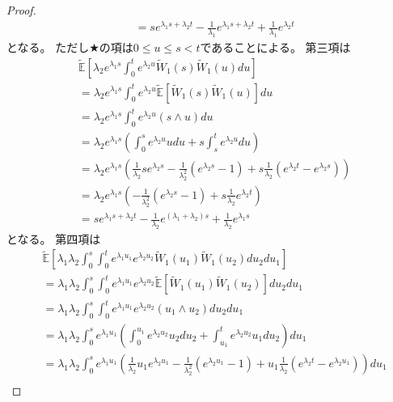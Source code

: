 \documentclass[uplatex]{jsarticle}
\theoremstyle{definition}
\def\E{\mathbb{E}}
\begin{document}
\begin{proof}
\begin{align*}
    &= se^{\lambda_1s+\lambda_2t}
    - \frac{1}{\lambda_1}e^{\lambda_1s+\lambda_2t}
    + \frac{1}{\lambda_1}e^{\lambda_2t}
  \end{align*}
  となる。
  ただし\(\bigstar\)の項は\(0\leq u \leq s < t\)であることによる。
  第三項は
  \begin{align*}
    &\tilde{\E}\left[ \lambda_2e^{\lambda_1s}\int_0^t
    e^{\lambda_2u}\tilde{W}_1(s)\tilde{W}_1(u)du \right] \\
    &= \lambda_2e^{\lambda_1s}\int_0^te^{\lambda_2u}
    \tilde{\E}\left[ \tilde{W}_1(s)\tilde{W}_1(u)\right] du \\
    &= \lambda_2e^{\lambda_1s}\int_0^te^{\lambda_2u} (s\wedge u) du \\
    &= \lambda_2e^{\lambda_1s}\left(
    \int_0^se^{\lambda_2u} u du + s\int_s^te^{\lambda_2u}du \right) \\
    &= \lambda_2e^{\lambda_1s}\left(
    \frac{1}{\lambda_2}se^{\lambda_2s}
    - \frac{1}{\lambda_2^2}\left( e^{\lambda_2s} - 1 \right)
    + s\frac{1}{\lambda_2}\left( e^{\lambda_2t}-e^{\lambda_2s} \right) \right) \\
    &= \lambda_2e^{\lambda_1s}\left(
    - \frac{1}{\lambda_2^2}\left( e^{\lambda_2s} - 1 \right)
    + s\frac{1}{\lambda_2}e^{\lambda_2t} \right) \\
    &= se^{\lambda_1s+\lambda_2t}
    - \frac{1}{\lambda_2}e^{(\lambda_1+\lambda_2)s}
    + \frac{1}{\lambda_2}e^{\lambda_1s}
  \end{align*}
  となる。
  第四項は
  \begin{align*}
    &\tilde{\E}\left[ \lambda_1\lambda_2\int_0^s\int_0^t
    e^{\lambda_1u_1}e^{\lambda_2u_2}\tilde{W}_1(u_1)\tilde{W}_1(u_2)
    du_2du_1 \right] \\
    &= \lambda_1\lambda_2 \int_0^s\int_0^t e^{\lambda_1u_1}e^{\lambda_2u_2}
    \tilde{\E}\left[ \tilde{W}_1(u_1)\tilde{W}_1(u_2)\right] du_2du_1 \\
    &= \lambda_1\lambda_2 \int_0^s \int_0^t e^{\lambda_1u_1}e^{\lambda_2u_2}
    (u_1\wedge u_2) du_2du_1 \\
    &= \lambda_1\lambda_2 \int_0^s e^{\lambda_1u_1}
    \left( \int_0^{u_1} e^{\lambda_2u_2} u_2 du_2
    + \int_{u_1}^t e^{\lambda_2u_2} u_1 du_2\right) du_1 \\
    &= \lambda_1\lambda_2 \int_0^s e^{\lambda_1u_1}
    \left( \frac{1}{\lambda_2}u_1e^{\lambda_2u_1}
    - \frac{1}{\lambda_2^2}\left( e^{\lambda_2u_1} - 1 \right)
    + u_1\frac{1}{\lambda_2}\left( e^{\lambda_2t}-e^{\lambda_2u_1}\right)
    \right) du_1 \\

\end{align*}
\end{proof}
\end{document}
